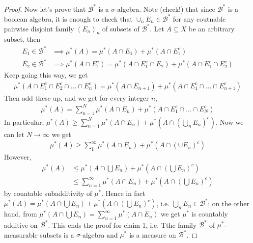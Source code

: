 \documentclass[a4paper]{article}
\begin{document}
\begin{thm}
\begin{proof}
Now let's prove that $\mathcal{B}^*$ is a $\sigma$-algebra. Note (check!) that since $\mathcal{B}^*$ is a boolean algebra, it is enough to check that $\cup_n E_n \in \mathcal{B}^*$ for any coutnable pairwise disjoint family $(E_n)_n$ of subsets of $\mathcal{B}^*$. Let $A \subseteq X$ be an arbitrary subset, then
\begin{equation*}
\begin{aligned}
E_1 \in \mathcal{B}^* &\implies \mu^*(A) = \mu^*(A \cap E_1)+\mu^*(A \cap E_1^c)\\
E_2 \in \mathcal{B}^* &\implies \mu^*(A \cap E_1^c) = \mu^*(A\cap E_1^c\cap E_2) + \mu^*(A\cap E_1^c \cap E_2^c)
\end{aligned}
\end{equation*}
Keep going this way, we get
\begin{equation*}
\begin{aligned}
\mu^*(A \cap E_1^c \cap E_2^c \cap ... \cap E_n^c) = \mu^*(A \cap E_{n+1}) + \mu^*( A \cap E_1^c \cap ... \cap E_{n+1}^c)
\end{aligned}
\end{equation*}
Then add these up, and we get for every integer $n$,
\begin{equation*}
\begin{aligned}
\mu^*(A) = \sum_{n=1}^N \mu^*(A \cap E_n) + \mu^*(A \cap E_1^c \cap ... \cap E_N^c)
\end{aligned}
\end{equation*}
In particular, $\mu^*(A) \geq \sum_{n=1}^N \mu^*(A \cap E_n) + \mu^*(A \cap (\bigcup_n E_n)^c)$. Now we can let $N \to \infty$ we get 
\begin{equation*}
\begin{aligned}
\mu^*(A) \geq \sum_1^\infty \mu^*(A \cap E_n) + \mu^*(A \cap (\cup E_n)^c)
\end{aligned}
\end{equation*}
However, 
\begin{equation*}
\begin{aligned}
\mu^*(A) &\leq \mu^*(A \cap \bigcup E_n) + \mu^*(A \cap (\bigcup E_n)^c)\\
&\leq \sum_{n=1}^\infty \mu^*(A \cap E_n) + \mu^*(A \cap (\bigcup E_n)^c)
\end{aligned}
\end{equation*}
by countable subadditivity of $\mu^*$. Hence in fact $\mu^*(A) = \mu^*(A \cap \bigcup E_n) + \mu^*(A \cap (\bigcup E_n)^c)$, i.e. $\bigcup_n E_n \in \mathcal{B}^*$; on the other hand, from $\mu^*(A \cap \bigcup E_n) = \sum_{n=1}^\infty \mu^*(A \cap E_n)$ we get $\mu^*$ is countably additive on $\mathcal{B}^*$. This ends the proof for claim 1, i.e. Tthe family $\mathcal{B}^*$ of $\mu^*$-measurable subsets is a $\sigma$-algebra and $\mu^*$ is a measure on $\mathcal{B}^*$.


\end{proof}
\end{thm}
\end{document}
